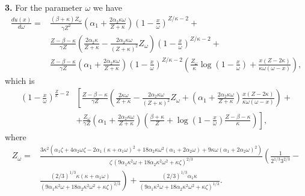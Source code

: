 \documentclass{article}
\begin{document}
\begin{appendices}

\bigskip

{\bf 3.} For the parameter $\omega$ we have
\begin{equation}\label{eq:dw}
\begin{split}
  \frac{d u(x)}{d\omega} =& \frac{(\beta+\kappa)Z_{\omega}}{\gamma Z^2}\left(\alpha_1 + \frac{2\alpha_2 \kappa\omega}{Z+\kappa}\right)\left(1-\frac{x}{\omega}\right)^{Z/\kappa-2}+\\
&  \frac{Z-\beta-\kappa}{\gamma Z} \left(\frac{2\alpha_2\kappa}{Z+\kappa}-\frac{2\alpha_2\kappa\omega}{(Z+\kappa)^2}Z_{\omega}\right)\left(1-\frac{x}{\omega}\right)^{Z/\kappa-2}+\\ 
& \frac{Z-\beta-\kappa}{\gamma Z}\left(\alpha_1+ \frac{2\alpha_2 \kappa\omega}{Z+\kappa}
\right)\left(1-\frac{x}{\omega}\right)^{Z/\kappa-2}\left(\frac{Z_{\omega}}{\kappa}\log\left(1-\frac{x}{\omega}\right)+\frac{x(Z-2\kappa)}{\kappa\omega(\omega- x)}\right), 
  \end{split}
\end{equation}
which is 
\begin{equation}\begin{split}
\left(1-\frac{x}{\omega}\right)^{\frac{Z}{\kappa}-2}&\left[ 
 \frac{Z-\beta-\kappa}{\gamma Z} \left(\frac{2\kappa\omega}{Z+\kappa}-\frac{2\alpha_2\kappa\omega}{(Z+\kappa)^2}Z_{\omega} + \left(\alpha_1+ \frac{2\alpha_2 \kappa\omega}{Z+\kappa}
\right) \frac{x(Z-2\kappa)}{\kappa\omega(\omega- x)} \right)+ \right.\\
&\left. +\frac{Z_{\omega}}{\gamma Z}\left(\alpha_1 + \frac{2\alpha_2 \kappa\omega}{Z+\kappa}\right) \left(\frac{\beta+\kappa}{Z}+\log\left(1-\frac{x}{\omega}\right)\frac{Z-\beta-\kappa}{\kappa}\right)  \right], 
\end{split}\end{equation}
where
\begin{equation}\begin{split}
Z_{\omega}=& \frac{3 \kappa^2 ( \alpha_1 \zeta + 4 \alpha_2  \omega \zeta - 2 \alpha_1  (\kappa + \alpha_1 \omega)^2 + 
   18 \alpha_2 \kappa \omega^2 (\alpha_1 + 2 \alpha_2 \omega) + 9 \kappa \omega (\alpha_1 + 2 \alpha_2 \omega)^2)}{\zeta\, (9 \alpha_1 \kappa^2 \omega + 18 \alpha_2 \kappa^2 \omega^2 +\kappa \zeta)^{2/3}}\left( \frac{1}{ 2^{1/3}3^{2/3}} -\right. \\
    &\left.\frac{(2/3)^{1/3} \kappa ( \kappa +  \alpha_1  \omega)}{(9 \alpha_1 \kappa^2 \omega + 18 \alpha_2 \kappa^2 \omega^2 +\kappa \zeta)^{2/3}} \right) + \frac{ (2/3)^{1/3} \alpha_1 \kappa}{ (9 \alpha_1 \kappa^2 \omega + 18 \alpha_2 \kappa^2 \omega^2 +\kappa \zeta)^{1/3}}.
  \end{split}\end{equation}



\end{appendices}
\end{document}

